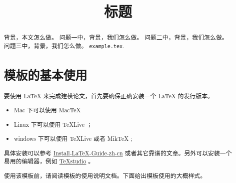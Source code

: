 \documentclass[withoutpreface,bwprint]{cumcmthesis} %
\title{标题}
\begin{document}
\maketitle
\begin{abstract}
背景，本文怎么做。
问题一中，背景，我们怎么做。
问题二中，背景，我们怎么做。
问题三中，背景，我们怎么做。 \texttt{example.tex}.

\section{模板的基本使用}

要使用 \LaTeX{} 来完成建模论文，首先要确保正确安装一个 \LaTeX{} 的发行版本。

\begin{itemize}
    \item Mac 下可以使用 Mac\TeX{}
    \item Linux 下可以使用 \TeX{}Live ；
    \item windows 下可以使用 \TeX{}Live 或者 Mik\TeX{} ;
\end{itemize}

具体安装可以参考 \href{https://github.com/OsbertWang/install-latex-guide-zh-cn/releases/}{Install-LaTeX-Guide-zh-cn} 或者其它靠谱的文章。另外可以安装一个易用的编辑器，例如 \href{https://mirrors.tuna.tsinghua.edu.cn/github-release/texstudio-org/texstudio/LatestRelease/}{\TeX{}studio} 。

使用该模板前，请阅读模板的使用说明文档。下面给出模板使用的大概样式。

\end{abstract}
\end{document}
